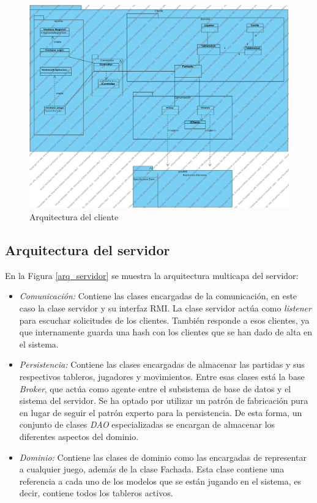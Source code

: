  \begin{figure}[h]
 \centering
 \includegraphics[scale=0.4]{img/arq_Cliente.png}
 \caption{Arquitectura del cliente}
 \label{arq_cliente}
 \end{figure}

\subsection{Arquitectura del servidor}

En la Figura \ref{arq_servidor} se muestra la arquitectura multicapa del servidor:

\begin{itemize}
 \item \emph{Comunicación:} Contiene las clases encargadas de la comunicación, en este caso la clase servidor y su interfaz
 RMI. La clase servidor actúa como \emph{listener} para escuchar solicitudes de los clientes. También responde a esos clientes,
 ya que internamente guarda una hash con los clientes que se han dado de alta en el sistema.
 \item \emph{Persistencia:} Contiene las clases encargadas de almacenar las partidas y sus respectivos tableros, jugadores
 y movimientos. Entre esas clases está la base \emph{Broker}, que actúa como agente entre el subsistema de base de datos y
 el sistema del servidor. Se ha optado por utilizar un patrón de fabricación pura en lugar de seguir el patrón experto para
 la persistencia. De esta forma, un conjunto de clases \emph{DAO} especializadas se encargan de almacenar los diferentes
 aspectos del dominio.
 \item \emph{Dominio:} Contiene las clases de dominio como las encargadas de representar a cualquier juego, además de la
 clase Fachada. Esta clase contiene una referencia a cada uno de los modelos que se están jugando en el sistema, es decir,
 contiene todos los tableros activos.
\end{itemize}


